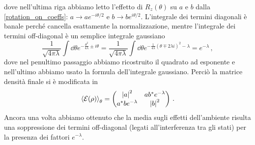 dove nell'ultima riga abbiamo letto l'effetto di $R_z(\theta)$ su $a$ e $b$ dalla \eqref{rotation_on_coeffs}: $a \to a e^{-i\theta/2}$ e $b \to b e^{i \theta/2}$. L'integrale dei termini diagonali è banale perché cancella esattamente la normalizzazione, mentre l'integrale dei termini off-diagonal è un semplice integrale gaussiano
\begin{equation*}
    \frac{1}{\sqrt{4\pi\lambda}} \int \dd{\theta} e^{-\frac{\theta^2}{4\lambda} \pm i \theta} = \frac{1}{\sqrt{4\pi\lambda}} \int \dd{\theta} e^{-\frac{1}{4\lambda}(\theta \mp 2 \lambda i)^2 - \lambda} = e^{-\lambda} \, ,
\end{equation*}
dove nel penultimo passaggio abbiamo ricostruito il quadrato ad esponente e nell'ultimo abbiamo usato la formula dell'integrale gaussiano. Perciò la matrice densità finale si è modificata in
\begin{equation*}
    \expval{\mathcal{E}(\rho)}_\theta =
    \begin{pmatrix}
        \abs{a}^2 & a b^\ast e^{-\lambda} \\
        a^\ast b e^{-\lambda} & \abs{b}^2
    \end{pmatrix} \, .
\end{equation*}
Ancora una volta abbiamo ottenuto che la media sugli effetti dell'ambiente risulta una soppressione dei termini off-diagonal (legati all'interferenza tra gli stati) per la presenza dei fattori $e^{-\lambda}$. 


